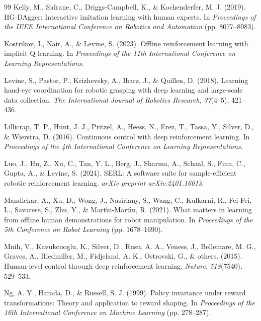 \documentclass[12pt,a4paper]{article}
\begin{document}
\begin{thebibliography}{99}
Kelly, M., Sidrane, C., Driggs-Campbell, K., \& Kochenderfer, M. J. (2019). HG-DAgger: Interactive imitation learning with human experts. In \emph{Proceedings of the IEEE International Conference on Robotics and Automation} (pp. 8077--8083).

Kostrikov, I., Nair, A., \& Levine, S. (2023). Offline reinforcement learning with implicit Q-learning. In \emph{Proceedings of the 11th International Conference on Learning Representations}.

Levine, S., Pastor, P., Krizhevsky, A., Ibarz, J., \& Quillen, D. (2018). Learning hand-eye coordination for robotic grasping with deep learning and large-scale data collection. \emph{The International Journal of Robotics Research}, \emph{37}(4--5), 421--436.

Lillicrap, T. P., Hunt, J. J., Pritzel, A., Heess, N., Erez, T., Tassa, Y., Silver, D., \& Wierstra, D. (2016). Continuous control with deep reinforcement learning. In \emph{Proceedings of the 4th International Conference on Learning Representations}.

Luo, J., Hu, Z., Xu, C., Tan, Y. L., Berg, J., Sharma, A., Schaal, S., Finn, C., Gupta, A., \& Levine, S. (2024). SERL: A software suite for sample-efficient robotic reinforcement learning. \emph{arXiv preprint arXiv:2401.16013}.

Mandlekar, A., Xu, D., Wong, J., Nasiriany, S., Wang, C., Kulkarni, R., Fei-Fei, L., Savarese, S., Zhu, Y., \& Mart\'{\i}n-Mart\'{\i}n, R. (2021). What matters in learning from offline human demonstrations for robot manipulation. In \emph{Proceedings of the 5th Conference on Robot Learning} (pp. 1678--1690).

Mnih, V., Kavukcuoglu, K., Silver, D., Rusu, A. A., Veness, J., Bellemare, M. G., Graves, A., Riedmiller, M., Fidjeland, A. K., Ostrovski, G., \& others. (2015). Human-level control through deep reinforcement learning. \emph{Nature}, \emph{518}(7540), 529--533.

Ng, A. Y., Harada, D., \& Russell, S. J. (1999). Policy invariance under reward transformations: Theory and application to reward shaping. In \emph{Proceedings of the 16th International Conference on Machine Learning} (pp. 278--287).


\end{thebibliography}
\end{document}
